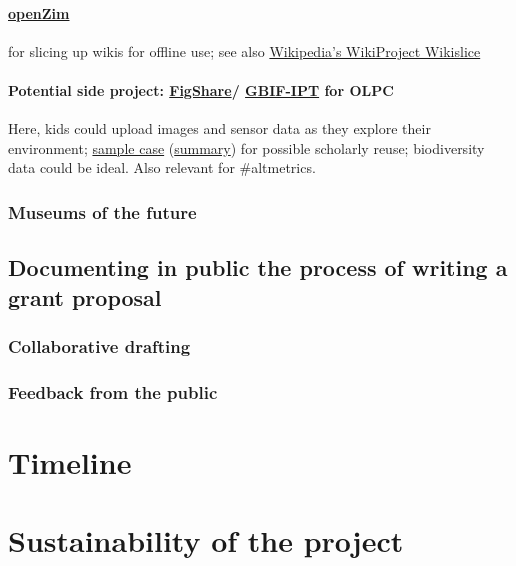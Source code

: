 \documentclass[final,authoryear,3p]{elsarticle-open-drafting}
\begin{document}
\paragraph{\href{http://www.openzim.org}{openZim}} for slicing up wikis for offline use; see also \href{http://en.wikipedia.org/wiki/Wikipedia:WikiProject_Wikislice}{Wikipedia's WikiProject Wikislice}
\paragraph{Potential side project: \href{http://figshare.com/}{FigShare}/ \href{http://www.gbif.org/communications/news-and-events/showsingle/article/new-incentive-for-biodiversity-data-publishing/}{GBIF-IPT} for OLPC} 
Here, kids could upload images and sensor data as they explore their environment; \href{http://dx.doi.org/10.3897/zookeys.89.903}{sample case} (\href{http://www.eurekalert.org/pub_releases/2011-05/pp-snh051711.php}{summary}) for possible scholarly reuse; biodiversity data could be ideal. Also relevant for \#altmetrics.
\subsubsection{Museums of the future}
\subsection{Documenting in public the process of writing a grant proposal}
\subsubsection{Collaborative drafting}
\subsubsection{Feedback from the public}

\section{Timeline}

\section{Sustainability of the project}
\end{document}
